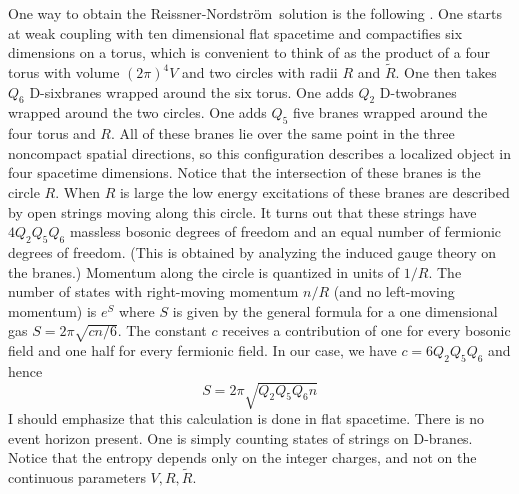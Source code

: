 \documentclass[12pt]{article}
\newcommand{\eq}{\begin{equation}}
\newcommand{\eqe}{\end{equation}}
\newcommand{\e}[1]{\label{eq:#1}}
\newcommand{\RN}{Reissner-Nordstr\"om}
\begin{document}
One way to obtain the \RN\ solution is the following \cite{mast1}.
One starts at weak coupling
with  ten dimensional flat spacetime and compactifies six dimensions
on a torus, which is convenient to think of as the product
of a four torus with volume $(2\pi)^4 V$ and two circles with
radii $R$ and $\tilde R$. One then takes $Q_6$ D-sixbranes wrapped around
the six torus. One adds $Q_2$ D-twobranes wrapped around the two circles.
One adds $Q_5$ five branes wrapped around the four torus and $R$.  All
of these branes lie over the same point in the three noncompact spatial
directions, so this configuration
describes a localized object in four spacetime dimensions.
Notice
that the intersection of these branes is the circle $R$. When $R$
is large the low energy excitations of these branes are described by open
strings moving along this circle. It turns out that these strings have
$4Q_2 Q_5 Q_6$
massless bosonic degrees of freedom and an equal number of fermionic
degrees of freedom. (This is obtained by analyzing the induced gauge theory
on the branes.) Momentum along the circle is quantized in units of $1/R$.
The number of states with right-moving momentum  $n/R$ (and no left-moving
momentum) is $e^S$ where $S$ is given by
the general formula for a one dimensional
gas $S= 2\pi \sqrt{cn/6}$. The constant $c$  receives a contribution of
one for every bosonic field and one half
for every fermionic field. 
In our case, we have $c= 6Q_2 Q_5 Q_6$
and hence
\eq\e{stent}
S=  2\pi \sqrt{Q_2 Q_5 Q_6 n}
\eqe
I should emphasize that this calculation is done in flat spacetime. There
is no event horizon present. One is simply counting states of strings on
D-branes.
Notice that the entropy depends only on the integer charges, and
not on the continuous parameters $V, R, \tilde R$.
\end{document}
